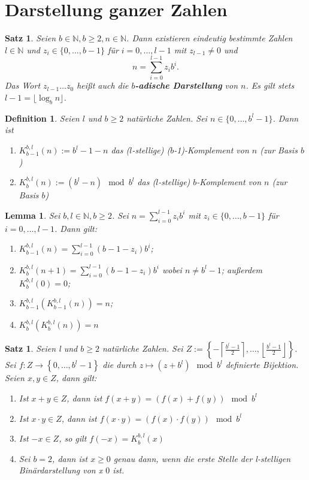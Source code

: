 \documentclass[12pt,a4paper]{article}
\theoremstyle{plain}
\newtheorem{Satz}[Theorem]{Satz}
\newtheorem{Lemma}[Theorem]{Lemma}
\newtheorem{Definition}[Theorem]{Definition}
\newcommand{\herv}[1]{{\emph{\textbf{#1}}}}
\newcommand{\N}{\mathbb{N}}
\numberwithin{equation}{section}
\begin{document}
\section{Darstellung ganzer Zahlen}
\begin{Satz}
Seien $b\in \N, b\geq 2, n\in \N$. Dann existieren eindeutig bestimmte Zahlen $l \in \N$ und $z_i\in\{0,\ldots,b-1\}$ für $i=0,\ldots,l-1$ mit $z_{l-1}\neq 0$ und \\
\[n=\sum_{i=0}^{l-1}{z_ib^i}.\] Das Wort $z_{l-1}\ldots z_0$ heißt auch die \herv{$b$-adische Darstellung} von $n$. Es gilt stets $l-1=\lfloor\log_b n\rfloor$.
\end{Satz}
\begin{Definition}
Seien $l$ und $b\geq 2$ natürliche Zahlen. Sei $n\in \{0,\ldots,b^l-1\}$. Dann ist
\renewcommand{\labelenumi}{\emph{(\alph{enumi})}}
\begin{enumerate}
\item $K_{b-1}^{b,l}(n):=b^l-1-n$ das ($l$-stellige) ($b$-1)-Komplement von $n$ (zur Basis $b$)
\item $K_b^{b,l}(n):=\left(b^l-n\right)\mod b^l$ das ($l$-stellige) $b$-Komplement von $n$ (zur Basis $b$)
\end{enumerate}
\end{Definition}
\begin{Lemma}
Sei $b,l\in\N, b\geq 2$. Sei $n=\sum_{i=0}^{l-1}{z_ib^i}$ mit $z_i\in\{0,\ldots,b-1\}$ für $i=0,\ldots,l-1$. Dann gilt:
\renewcommand{\labelenumi}{\emph{(\roman{enumi})}}
\begin{enumerate}
\item $K_{b-1}^{b,l}(n)=\sum_{i=0}^{l-1}{\left(b-1-z_i\right) b^i}$;
\item $K_b^{b,l}(n+1)=\sum_{i=0}^{l-1}{\left(b-1-z_i\right) b^i}$ wobei $n\neq b^l-1$; außerdem $K_b^{b,l}(0)=0$;
\item $K_{b-1}^{b,l}\left(K_{b-1}^{b,l}(n)\right)=n$;
\item $K_{b}^{b,l}\left(K_{b}^{b,l}(n)\right)=n$
\end{enumerate}
\end{Lemma}
\begin{Satz}
Seien l und $b\geq 2$ natürliche Zahlen. Sei $Z:=\left\lbrace -\left\lceil\frac{b^l-1}{2}\right\rceil,\ldots,\left\lfloor\frac{b^l-1}{2}\right\rfloor\right\rbrace$. \\ Sei $f:Z \rightarrow \left\lbrace 0,\ldots,b^l-1 \right\rbrace$ die durch $z\mapsto \left(z+b^l \right) \mod b^l$ definierte Bijektion. Seien $x,y \in Z$, dann gilt:
\renewcommand{\labelenumi}{\emph{(\alph{enumi})}}
\begin{enumerate}
\item Ist $x+y \in Z$, dann ist $f(x+y)=(f(x)+f(y))\mod b^l$
\item Ist $x\cdot y \in Z$, dann ist $f(x\cdot y)=(f(x)\cdot f(y))\mod b^l$
\item Ist $-x \in Z$, so gilt $f(-x)=K_b^{b,l}(x)$
\item Sei $b=2$, dann ist $x\geq 0$ genau dann, wenn die erste Stelle der l-stelligen Binärdarstellung von x $0$ ist.
\end{enumerate}
\end{Satz}
\end{document}

